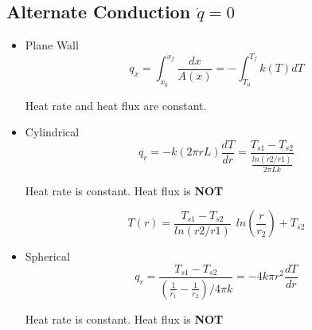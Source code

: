 \documentclass[twocolumn, 12pt]{article}
\begin{document}
\subsection*{Alternate Conduction \(\dot{q} =0\)}
    \begin{itemize}
        \item Plane Wall
                \begin{equation*}
                    q_x = \int^{x_f}_{x_0} \frac{dx}{A(x)} = - \int^{T_f}_{T_0}k(T)dT
                \end{equation*}
                \begin{center}
                    Heat rate and heat flux are constant.
                \end{center}
        \item Cylindrical 
                \begin{equation*}
                    q_r = -k(2\pi rL) \frac{dT}{dr} = \frac{T_{s1}-T_{s2}}{\frac{ln(r2/r1)}{2\pi Lk}}
                \end{equation*}
                \begin{center}
                    Heat rate is constant. Heat flux is \textbf{NOT}
                \end{center}
                \begin{equation*}
                    T(r)=\frac{T_{s1}-T_{s2}}{ln(r2/r1)} \hspace{5pt} ln\left(\frac{r}{r_2}\right) + T_{s2}
                \end{equation*}
                
        \item Spherical
                \begin{equation*}
                    q_r = \frac{T_{s1}-T_{s2}}{\left(\frac{1}{r_1}-\frac{1}{r_2}\right)/4\pi k} = -4 k\pi r^2 \frac{dT}{dr}
                \end{equation*}
                \begin{center}
                    Heat rate is constant. Heat flux is \textbf{NOT}
                \end{center}
    \end{itemize}

    
    
\end{document}
